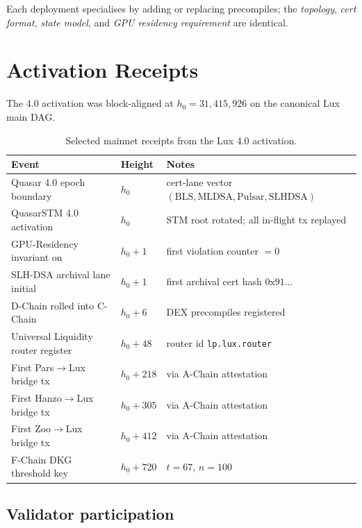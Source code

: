 \documentclass[11pt,a4paper]{article}
\begin{document}
Each deployment specialises by adding or replacing precompiles; the
\emph{topology}, \emph{cert format}, \emph{state model}, and \emph{GPU
residency requirement} are identical.

\section{Activation Receipts}
\label{sec:receipts}

The 4.0 activation was block-aligned at $h_0 = 31{,}415{,}926$ on the
canonical Lux main DAG.

\begin{table}[H]
\centering
\small
\begin{tabular}{lll}
\toprule
\textbf{Event} & \textbf{Height} & \textbf{Notes} \\
\midrule
Quasar 4.0 epoch boundary & $h_0$ & cert-lane vector $(\text{BLS},\text{MLDSA},\text{Pulsar},\text{SLHDSA})$ \\
QuasarSTM 4.0 activation & $h_0$ & STM root rotated; all in-flight tx replayed \\
GPU-Residency invariant on & $h_0 + 1$ & first violation counter $= 0$ \\
SLH-DSA archival lane initial & $h_0 + 1$ & first archival cert hash $0\text{x91}\dots$ \\
D-Chain rolled into C-Chain & $h_0 + 6$ & DEX precompiles registered \\
Universal Liquidity router register & $h_0 + 48$ & router id \texttt{lp.lux.router} \\
First Pars$\to$Lux bridge tx & $h_0 + 218$ & via A-Chain attestation \\
First Hanzo$\to$Lux bridge tx & $h_0 + 305$ & via A-Chain attestation \\
First Zoo$\to$Lux bridge tx & $h_0 + 412$ & via A-Chain attestation \\
F-Chain DKG threshold key & $h_0 + 720$ & $t = 67$, $n = 100$ \\
\bottomrule
\end{tabular}
\caption{Selected mainnet receipts from the Lux 4.0 activation.}
\end{table}

\subsection{Validator participation}
\end{document}
